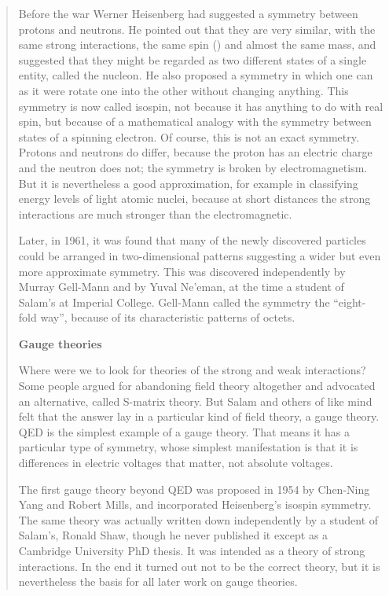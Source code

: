 \begin{quote}
Before the war Werner Heisenberg had suggested a symmetry between protons and neutrons. He pointed out that they are very similar, with the same strong interactions, the same spin () and almost the same mass, and suggested that they might be regarded as two different states of a single entity, called the nucleon. He also proposed a symmetry in which one can as it were rotate one into the other without changing anything. This symmetry is now called isospin, not because it has anything to do with real spin, but because of a mathematical analogy with the symmetry between states of a spinning electron. Of course, this is not an exact symmetry. Protons and neutrons do differ, because the proton has an electric charge and the neutron does not; the symmetry is broken by electromagnetism. But it is nevertheless a good approximation, for example in classifying energy levels of light atomic nuclei, because at short distances the strong interactions are much stronger than the electromagnetic.

Later, in 1961, it was found that many of the newly discovered particles could be arranged in two-dimensional patterns suggesting a wider but even more approximate symmetry. This was discovered independently by Murray Gell-Mann and by Yuval Ne’eman, at the time a student of Salam’s at Imperial College. Gell-Mann called the symmetry the “eight-fold way”, because of its characteristic patterns of octets.

\textbf{Gauge theories}

Where were we to look for theories of the strong and weak interactions? Some people argued for abandoning field theory altogether and advocated an alternative, called S-matrix theory. But Salam and others of like mind felt that the answer lay in a particular kind of field theory, a gauge theory. QED is the simplest example of a gauge theory. That means it has a particular type of symmetry, whose simplest manifestation is that it is differences in electric voltages that matter, not absolute voltages. 

The first gauge theory beyond QED was proposed in 1954 by Chen-Ning Yang and Robert Mills, and incorporated Heisenberg’s isospin symmetry. The same theory was actually written down independently by a student of Salam’s, Ronald Shaw, though he never published it except as a Cambridge University PhD thesis. It was intended as a theory of strong interactions. In the end it turned out not to be the correct theory, but it is nevertheless the basis for all later work on gauge theories.


\end{quote}
